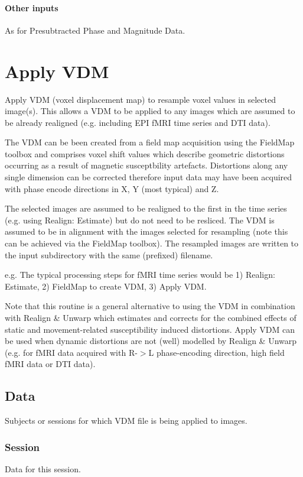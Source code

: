 \paragraph{Other inputs}
As for Presubtracted Phase and Magnitude Data.

\section{Apply VDM }
Apply VDM (voxel displacement map) to resample voxel values in selected image(s). This allows a VDM to be applied to any images which are assumed to be already realigned (e.g. including EPI fMRI time series and DTI data).

The VDM can be been created from a field map acquisition using the FieldMap toolbox and comprises voxel shift values which describe geometric distortions occurring as a result of magnetic susceptbility artefacts. Distortions along any single dimension can be corrected therefore input data may have been acquired with phase encode directions in X, Y (most typical) and Z.

The selected images are assumed to be realigned to the first in the time series (e.g. using Realign: Estimate) but do not need to be resliced. The VDM is assumed to be in alignment with the images selected for resampling (note this can be achieved via the FieldMap toolbox). The resampled images are written to the input subdirectory with the same (prefixed) filename.

e.g. The typical processing steps for fMRI time series would be 1) Realign: Estimate, 2) FieldMap to create VDM, 3) Apply VDM.

Note that this routine is a general alternative to using the VDM in combination with Realign \& Unwarp which estimates and corrects for the combined effects of static and movement-related susceptibility induced distortions. Apply VDM can be used when dynamic distortions are not (well) modelled by Realign \& Unwarp (e.g. for fMRI data acquired with R-$>$L phase-encoding direction, high field fMRI data or DTI data).


\subsection{Data}
Subjects or sessions for which VDM file is being applied to images.


\subsubsection{Session}
Data for this session.


